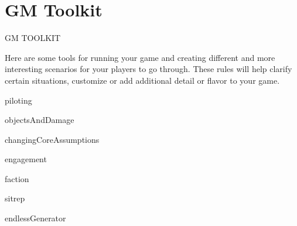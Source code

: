 \chapter{GM Toolkit}
                                     GM TOOLKIT

Here are some tools for running your game and creating different and more interesting scenarios
for your players to go through. These rules will help clarify certain situations, customize or add
additional detail or flavor to your game.

{piloting}

{objectsAndDamage}

{changingCoreAssumptions}

{engagement}

{faction}

{sitrep}

{endlessGenerator}